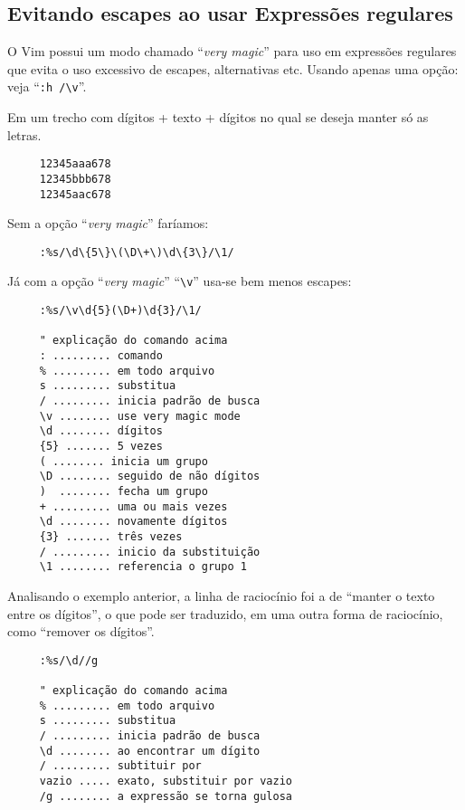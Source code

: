 \subsection{Evitando escapes ao usar Expressões regulares}

O Vim possui um modo chamado ``{\em very magic}'' para uso em expressões
regulares que evita o uso excessivo de escapes, alternativas etc. Usando apenas
uma opção: veja ``\verb+:h /\v+''.

Em um trecho com dígitos + texto + dígitos
no qual se deseja manter só as letras.

\begin{verbatim}
     12345aaa678
     12345bbb678
     12345aac678
\end{verbatim}

Sem a opção ``{\em very magic}'' faríamos:

\begin{verbatim}
     :%s/\d\{5\}\(\D\+\)\d\{3\}/\1/
\end{verbatim}

Já com a opção ``{\em very magic}'' ``\verb+\v+'' usa-se bem menos escapes:

\begin{verbatim}
     :%s/\v\d{5}(\D+)\d{3}/\1/

     " explicação do comando acima
     : ......... comando
     % ......... em todo arquivo
     s ......... substitua
     / ......... inicia padrão de busca
     \v ........ use very magic mode
     \d ........ dígitos
     {5} ....... 5 vezes 
     ( ........ inicia um grupo
     \D ........ seguido de não dígitos
     )  ........ fecha um grupo     
     + ......... uma ou mais vezes
     \d ........ novamente dígitos
     {3} ....... três vezes 
     / ......... inicio da substituição
     \1 ........ referencia o grupo 1
\end{verbatim}

Analisando o exemplo anterior, a linha de raciocínio foi a de ``manter o texto entre os
dígitos'', o que pode ser traduzido, em uma outra forma de raciocínio, como ``remover os
dígitos''.

\begin{verbatim}
     :%s/\d//g

     " explicação do comando acima
     % ......... em todo arquivo
     s ......... substitua
     / ......... inicia padrão de busca
     \d ........ ao encontrar um dígito
     / ......... subtituir por
     vazio ..... exato, substituir por vazio
     /g ........ a expressão se torna gulosa
\end{verbatim}

